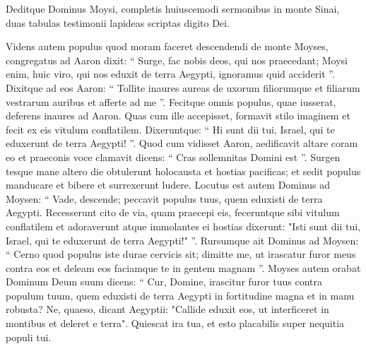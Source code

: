 \begin{biblechapter}
\begin{biblechapter}
\begin{biblechapter}
\begin{biblechapter}
\begin{biblechapter}
\begin{biblechapter}
\begin{biblechapter}
\begin{biblechapter}
\begin{biblechapter}
\begin{biblechapter}
\begin{biblechapter}
\begin{biblechapter}
\begin{biblechapter}
\begin{biblechapter}
\begin{biblechapter}
\begin{biblechapter}
\begin{biblechapter}
\begin{biblechapter}
\begin{biblechapter}
\begin{biblechapter}
\begin{biblechapter}
\begin{biblechapter}
\begin{biblechapter}
\begin{biblechapter}
\begin{biblechapter}
\begin{biblechapter}
\begin{biblechapter}
\begin{biblechapter}
\begin{biblechapter}
\begin{biblechapter}
\begin{biblechapter}
 \verse Deditque Dominus Moysi, completis huiuscemodi sermonibus in monte Sinai, duas tabulas testimonii lapideas scriptas digito Dei.
 
\begin{biblechapter}
\verse Videns autem populus quod moram faceret descendendi de monte Moyses, congregatus ad Aaron dixit: “ Surge, fac nobis deos, qui nos praecedant; Moysi enim, huic viro, qui nos eduxit de terra Aegypti, ignoramus quid acciderit ”. 
\verse Dixitque ad eos Aaron: “ Tollite inaures aureas de uxorum filiorumque et filiarum vestrarum auribus et afferte ad me ”. 
\verse Fecitque omnis populus, quae iusserat, deferens inaures ad Aaron. 
\verse Quas cum ille accepisset, formavit stilo imaginem et fecit ex eis vitulum conflatilem. Dixeruntque: “ Hi sunt dii tui, Israel, qui te eduxerunt de terra Aegypti! ”. 
\verse Quod cum vidisset Aaron, aedificavit altare coram eo et praeconis voce clamavit dicens: “ Cras sollemnitas Domini est ”. 
\verse Surgen tesque mane altero die obtulerunt holocausta et hostias pacificas; et sedit populus manducare et bibere et surrexerunt ludere.
 \verse Locutus est autem Dominus ad Moysen: “ Vade, descende; peccavit populus tuus, quem eduxisti de terra Aegypti. 
\verse Recesserunt cito de via, quam praecepi eis, feceruntque sibi vitulum conflatilem et adoraverunt atque immolantes ei hostias dixerunt: "Isti sunt dii tui, Israel, qui te eduxerunt de terra Aegypti!" ”. 
\verse Rursumque ait Dominus ad Moysen: “ Cerno quod populus iste durae cervicis sit; 
\verse dimitte me, ut irascatur furor meus contra eos et deleam eos faciamque te in gentem magnam ”.
 \verse Moyses autem orabat Dominum Deum suum dicens: “ Cur, Domine, irascitur furor tuus contra populum tuum, quem eduxisti de terra Aegypti in fortitudine magna et in manu robusta? 
\verse Ne, quaeso, dicant Aegyptii: "Callide eduxit eos, ut interficeret in montibus et deleret e terra". Quiescat ira tua, et esto placabilis super nequitia populi tui. 

\end{biblechapter}
\end{biblechapter}
\end{biblechapter}
\end{biblechapter}
\end{biblechapter}
\end{biblechapter}
\end{biblechapter}
\end{biblechapter}
\end{biblechapter}
\end{biblechapter}
\end{biblechapter}
\end{biblechapter}
\end{biblechapter}
\end{biblechapter}
\end{biblechapter}
\end{biblechapter}
\end{biblechapter}
\end{biblechapter}
\end{biblechapter}
\end{biblechapter}
\end{biblechapter}
\end{biblechapter}
\end{biblechapter}
\end{biblechapter}
\end{biblechapter}
\end{biblechapter}
\end{biblechapter}
\end{biblechapter}
\end{biblechapter}
\end{biblechapter}
\end{biblechapter}
\end{biblechapter}
